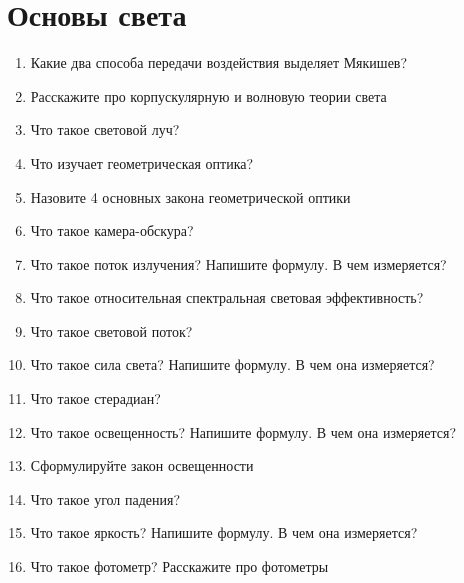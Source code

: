 \documentclass[12pt,a4paper]{report}
\begin{document}
\section{Основы света}
\begin{enumerate}
\item Какие два способа передачи воздействия выделяет Мякишев?
\item Расскажите про корпускулярную и волновую теории света
\item Что такое световой луч?
\item Что изучает геометрическая оптика?
\item Назовите 4 основных закона геометрической оптики
\item Что такое камера-обскура?
\item Что такое поток излучения? Напишите формулу. В чем измеряется?
\item Что такое относительная спектральная световая эффективность?
\item Что такое световой поток?
\item Что такое сила света? Напишите формулу. В чем она измеряется?
\item Что такое стерадиан?
\item Что такое освещенность? Напишите формулу. В чем она измеряется?
\item Сформулируйте закон освещенности
\item Что такое угол падения?
\item Что такое яркость? Напишите формулу. В чем она измеряется?
\item Что такое фотометр? Расскажите про фотометры


\end{enumerate}
\end{document}
